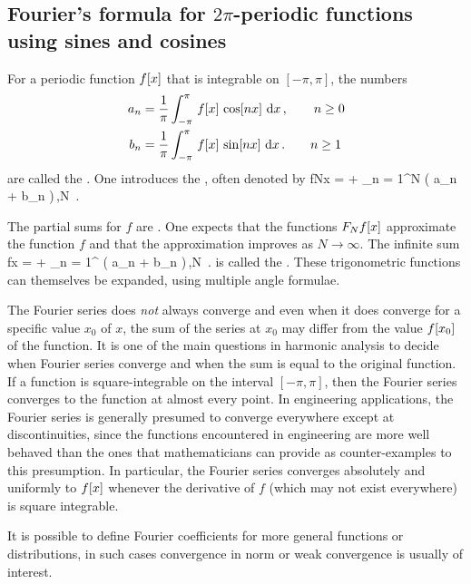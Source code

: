 \subsection{Fourier's formula for $2\pi$-periodic functions using sines and cosines}
For a periodic function $f\vat x$ that is integrable on $[-\pi,\pi]$, the numbers
\begin{align*}
a_n &= \dfrac{1}{\pi}\int_{-\pi}^{\pi}\,f\vat x\,\cos\vat{nx}\,\dx x\,,\qquad n\geq 0\\
b_n &= \dfrac{1}{\pi}\int_{-\pi}^{\pi}\,f\vat x\,\sin\vat{nx}\,\dx x\,.\qquad n\geq 1
\end{align*}
are called the . One introduces the , often denoted by
\beq
\nfsum fNx =  
             + \sum_{n = 1}^{N} \left( a_n\cos{} + b_n\sin{} \right)\,,\qquad N \,.
\eeq

The partial sums for $f$ are . One expects that the functions $\nfsum fNx$ approximate the function $f$ and that the approximation improves as $N\to\infty$. The infinite sum
\beq
\fseries fx =  
              + \sum_{n = 1}^{\infty} \left( a_n\cos{} + b_n\sin{} \right)\,,\qquad N \,.
\eeq
is called the . These trigonometric functions can themselves be expanded, using multiple angle formulae.

The Fourier series does \emph{not} always converge and even when it does converge for a specific value $x_0$ of $x$, the sum of the series at $x_0$ may differ from the value $f\vat{x_0}$ of the function. It is one of the main questions in harmonic analysis to decide when Fourier series converge and when the sum is equal to the original function. If a function is square-integrable on the interval $[-\pi,\pi]$, then the Fourier series converges to the function at almost every point. In engineering applications, the Fourier series is generally presumed to converge everywhere except at discontinuities, since the functions encountered in engineering are more well behaved than the ones that mathematicians can provide as counter-examples to this presumption. In particular, the Fourier series converges absolutely and uniformly to $f\vat x$ whenever the derivative of $f$ (which may not exist everywhere) is square integrable.

It is possible to define Fourier coefficients for more general functions or distributions, in such cases convergence in norm or weak convergence is usually of interest.


